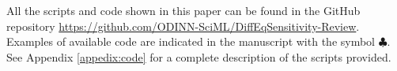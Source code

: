All the scripts and code shown in this paper can be found in the GitHub repository \url{https://github.com/ODINN-SciML/DiffEqSensitivity-Review}. 
Examples of available code are indicated in the manuscript with the symbol $\clubsuit$.
See Appendix \ref{appedix:code} for a complete description of the scripts provided. 